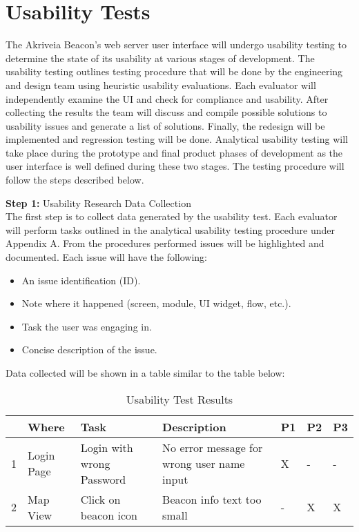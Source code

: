 

\setcounter{section}{5}
\section{Usability Tests}
\bigskip
The Akriveia Beacon’s web server user interface will undergo usability testing to determine the state of its usability at various stages of development. The usability testing outlines testing procedure that will be done by the engineering and design team using heuristic usability evaluations. Each evaluator will independently examine the UI and check for compliance and usability. After collecting the results the team will discuss and compile possible solutions to usability issues and generate a list of solutions. Finally, the redesign will be implemented and regression testing will be done. Analytical usability testing will take place during the prototype and final product phases of development as the user interface is well defined during these two stages. The testing procedure will follow the steps described below.

\bigskip

\textbf{Step 1:} Usability Research Data Collection\\
\medskip
The first step is to collect data generated by the usability test. Each evaluator will perform tasks outlined in the analytical usability testing procedure under Appendix A. From the procedures performed issues will be highlighted and documented. Each issue will have the following:
\begin{itemize}
\setlength\itemsep{0.1mm}
	\item An issue identification (ID).
	\item Note where it happened (screen, module, UI widget, flow, etc.).
	\item Task the user was engaging in.
	\item Concise description of the issue.
\end{itemize}
Data collected will be shown in a table similar to the table below:

\def\arraystretch{1.5}
\begin{table}[H]
\centering
\begin{tabular}{ | p{0.5cm} | p{2cm}| p{5cm} | p{5cm} | p{0.5cm} | p{0.5cm} | p{0.5cm}|} 
\hline

\rowcolor{lightgray} \multicolumn{1}{|l|}{\textbf{ID}} & \textbf{Where} & \textbf{Task} &  \textbf{Description} & \textbf{P1} & \textbf{P2} & \textbf{P3} \\ 
\hline
1 & Login Page & Login with wrong Password & No error message for wrong user name input & X & - & - \\
\hline
2 & Map View & Click on beacon icon & Beacon info text too small & - & X & X \\
\hline
\end{tabular}
\caption{Usability Test Results}
\end{table}	



